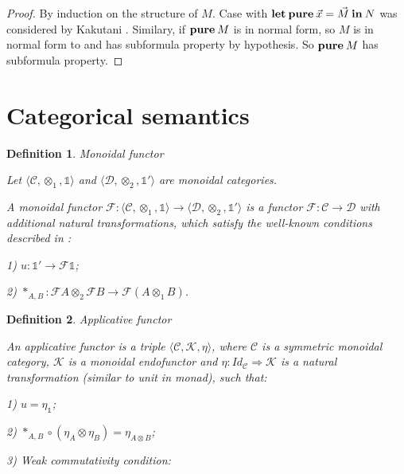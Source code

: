 \documentclass[a4paper]{article}
\newtheorem{defin}{Definition}
\begin{document}
\begin{proof}
  By induction on the structure of $M$.
  Case with ${\bf let \: pure\:} \vec{x} = \vec{M} {\: \bf in \:} N$ was considered by Kakutani \cite{ModalK} \cite{ModalK1}.
  Similary, if ${\bf pure \:} M$ is in normal form, so $M$ is in normal form to and has subformula property by hypothesis.
  So ${\bf pure \:} M$ has subformula property.
\end{proof}

\section{Categorical semantics}

\begin{defin} Monoidal functor

  Let $\langle \mathcal{C}, \otimes_1, \mathds{1} \rangle$ and $\langle \mathcal{D}, \otimes_2, \mathds{1}' \rangle$ are monoidal categories.

  A monoidal functor $\mathcal{F} : \langle \mathcal{C}, \otimes_1, \mathds{1} \rangle \to \langle \mathcal{D}, \otimes_2, \mathds{1}' \rangle$ is a functor
  $\mathcal{F} : \mathcal{C} \to \mathcal{D}$ with additional natural transformations, which satisfy the well-known conditions described in \cite{ElKelly}:

  1) $u : \mathds{1}' \to \mathcal{F}\mathds{1}$;

  2) $\ast_{A, B} : \mathcal{F}A \otimes_2 \mathcal{F}B \to \mathcal{F}(A \otimes_1 B)$.

\end{defin}

\begin{defin} Applicative functor

  An applicative functor is a triple $\langle \mathcal{C}, \mathcal{K}, \eta \rangle$,
where $\mathcal{C}$ is a symmetric monoidal category, $\mathcal{K}$ is a monoidal endofunctor and $\eta : Id_{\mathcal{C}} \Rightarrow \mathcal{K}$ is a natural transformation (similar to unit in monad), such that:

1) $u = \eta_{\mathds{1}}$;

2) $\ast_{A,B} \circ (\eta_A \otimes \eta_B) = \eta_{A \otimes B}$;

3) Weak commutativity condition:

\end{defin}
\end{document}
